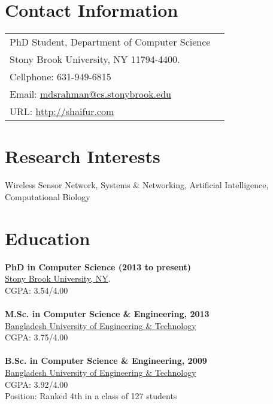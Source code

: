 \documentclass[margin,line,pifont,palatino,courier]{res}
\begin{document}

\begin{resume}

\section{\sc Contact Information}

\vspace{.05in} 
\begin{tabular}{@{}p{3.1in}p{2.3in}}
PhD Student, Department of Computer Science\\
Stony Brook University, NY 11794-4400. \\
Cellphone: 631-949-6815 \\
Email:
\href{mailto:mdsrahman@cs.stonybrook.edu}{mdsrahman@cs.stonybrook.edu}\\
URL: 
\href{http://shaifur.com}{http://shaifur.com}\\
\end{tabular}
 
\section{\sc Research Interests}
Wireless Sensor Network, Systems \& Networking, Artificial Intelligence,
Computational Biology

\section{\sc Education}
\textbf{PhD in Computer Science (2013 to present)} \\
\href{http://www.cs.sunysb.edu/}{Stony Brook University, NY}.  \\
CGPA: 3.54/4.00  
\\ \\
\textbf{M.Sc. in Computer Science \& Engineering, 2013} \\
\href{http://www.buet.ac.bd/cse/}{Bangladesh University of Engineering \&
Technology}
\\
CGPA: 3.75/4.00  
\\ \\
\textbf{B.Sc. in Computer Science \& Engineering, 2009} \\
\href{http://www.buet.ac.bd/cse/}{Bangladesh University of Engineering \&
Technology} \\
CGPA: 3.92/4.00\\
Position: Ranked 4th in a class of 127 students


\end{resume}
\end{document}
